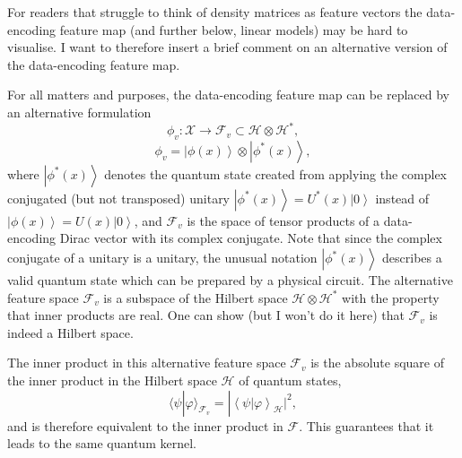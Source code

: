 \documentclass[aps, reprint, onecolumn, nofootinbib, longbibliography]{revtex4-2}
\newcommand{\ket}[1]{\ensuremath{\left| #1 \right \rangle}}
\newcommand{\braket}[2]{\ensuremath{\left\langle #1\left|#2 \right.\right\rangle}}
\begin{document}
For readers that struggle to think of density matrices as feature vectors the data-encoding feature map (and further below, linear models) may be hard to visualise. I want to therefore insert a brief comment on an alternative version of the data-encoding feature map.

For all matters and purposes, the data-encoding feature map can be replaced by an alternative formulation
\begin{equation}
    \phi_v: \mathcal{X} \rightarrow \mathcal{F}_v \subset \mathcal{H} \otimes \mathcal{H}^*, 
\end{equation}
\begin{equation} 
    \phi_v =  \ket{\phi(x)} \otimes \ket{\phi^*(x)},
\end{equation}
where $\ket{\phi^*(x)}$ denotes the quantum state created from applying the complex conjugated (but not transposed) unitary $\ket{\phi^*(x)} = U^*(x) \ket{0}$ instead of $\ket{\phi(x)} = U(x) \ket{0}$, and $\mathcal{F}_v$ is the space of tensor products of a data-encoding Dirac vector with its complex conjugate. Note that since the complex conjugate of a unitary is a unitary, the unusual notation $\ket{\phi^*(x)}$ describes a valid quantum state which can be prepared by a physical circuit. The alternative feature space $\mathcal{F}_v$ is a subspace of the Hilbert space $\mathcal{H} \otimes \mathcal{H}^*$ with the property that inner products are real. One can show (but I won't do it here) that $\mathcal{F}_v$ is indeed a Hilbert space.

The inner product in this alternative feature space $\mathcal{F}_v$ is the absolute square of the inner product in the Hilbert space $\mathcal{H}$ of quantum states,
\begin{equation} 
\langle \psi | \varphi \rangle_{\mathcal{F}_v} =  |\braket{\psi}{\varphi}_{\mathcal{H}}|^2, 
\end{equation} 
and is therefore equivalent to the inner product in $\mathcal{F}$. This guarantees that it leads to the same quantum kernel.
\end{document}
